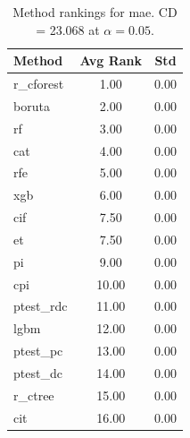\begin{table}[h]
\centering
\caption{Method rankings for mae. CD = 23.068 at $\alpha=0.05$.}
\label{tab:ranks_mae}
\begin{tabular}{lcc}
\toprule
Method & Avg Rank & Std \\
\midrule
r_cforest & 1.00 & 0.00 \\
boruta & 2.00 & 0.00 \\
rf & 3.00 & 0.00 \\
cat & 4.00 & 0.00 \\
rfe & 5.00 & 0.00 \\
xgb & 6.00 & 0.00 \\
cif & 7.50 & 0.00 \\
et & 7.50 & 0.00 \\
pi & 9.00 & 0.00 \\
cpi & 10.00 & 0.00 \\
ptest_rdc & 11.00 & 0.00 \\
lgbm & 12.00 & 0.00 \\
ptest_pc & 13.00 & 0.00 \\
ptest_dc & 14.00 & 0.00 \\
r_ctree & 15.00 & 0.00 \\
cit & 16.00 & 0.00 \\
\bottomrule
\end{tabular}
\end{table}